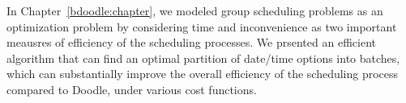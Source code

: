 \label{discussion:chapter}

In Chapter~\ref{bdoodle:chapter}, we modeled group scheduling problems as an optimization problem by considering time and inconvenience as two important meausres of efficiency of the scheduling processes. We prsented an efficient algorithm that can find an optimal partition of date/time options into batches, which can substantially improve the overall efficiency of the scheduling process compared to Doodle, under various cost functions.  